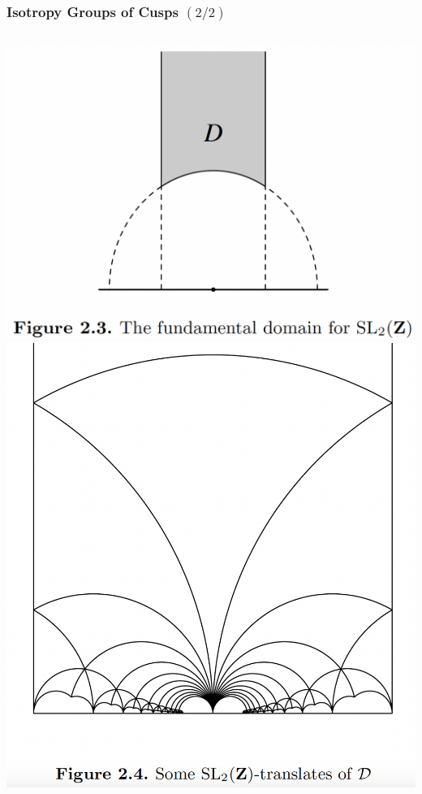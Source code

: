\documentclass[handout]{beamer}
\numberwithin{equation}{section}
\numberwithin{case}{theorem}
\newcommand{\<}{\left\langle}
\renewcommand{\>}{\right\rangle}
\begin{document}
	\begin{frame}
		\frametitle{Isotropy Groups of Cusps $(2/2)$}
		\begin{columns}
			\begin{column}{.5\textwidth}
				\includegraphics[scale=0.25]{classic-fund.png}\\
				\includegraphics[scale=0.2]{classic-cusps.png}
			\end{column}

\end{columns}
\end{frame}
\end{document}
